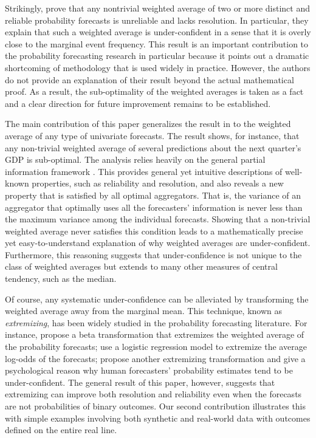 \documentclass[11pt]{article}
\theoremstyle{definition}
\theoremstyle{definition}
\begin{document}

Strikingly, \cite{Ranjan08} prove that any nontrivial weighted average of two or more distinct and reliable probability forecasts is unreliable and lacks resolution. In particular, they explain that such a weighted average is under-confident in a sense that it is overly close to the marginal event frequency.  This result is an important contribution to the probability forecasting research in particular because it points out a dramatic shortcoming of methodology that is used widely in practice. However, the authors do not provide an explanation of their result beyond the actual mathematical proof. As a result, the sub-optimality of the weighted averages is taken as a fact and a clear direction for future improvement remains to be established. 


The main contribution of this paper generalizes the result in \cite{Ranjan08} to the weighted average of any type of univariate forecasts. The result shows, for instance, that any non-trivial weighted average of several predictions about the next quarter's GDP is sub-optimal. 
 The analysis relies heavily on the general partial information framework \citep{satopaamodeling2, satopaamodeling}. This provides general yet intuitive descriptions of well-known properties, such as reliability and resolution, and also reveals a new property that is satisfied by all optimal aggregators. That is, the variance of an aggregator that optimally uses all the forecasters' information is never less than the maximum variance among the individual forecasts. Showing that a non-trivial weighted average never satisfies this condition leads to a mathematically precise yet easy-to-understand explanation of why weighted averages are under-confident. 
Furthermore, this reasoning suggests that under-confidence is not unique to the class of weighted averages but extends to many other measures of central tendency, such as the median. 

Of course, any systematic under-confidence can be alleviated by transforming the weighted average away from the marginal mean. This technique, known as \textit{extremizing}, has been widely studied in the probability forecasting literature. For instance,  \cite{Ranjan08} propose a beta transformation that extremizes the weighted average of the probability forecasts; \cite{satopaa} use a logistic regression model to extremize the average log-odds of the forecasts; \cite{baron2014two} propose another extremizing transformation and give a psychological reason why human forecasters' probability estimates tend to be under-confident. The general result of this paper, however, suggests that extremizing can improve both resolution and reliability even when the forecasts are not probabilities of binary outcomes. Our second contribution illustrates this with simple examples involving both synthetic and real-world data with outcomes defined on the entire real line. 
\end{document}
